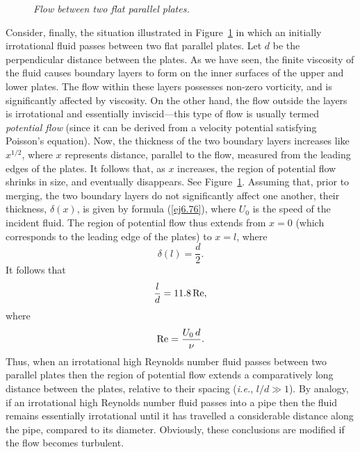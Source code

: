 \begin{figure}
\epsfysize=2.5in
\centerline{}
\caption{\em Flow between two flat parallel plates. }\label{fplate1}
\end{figure}

Consider, finally, the situation illustrated in Figure~\ref{fplate1} in which an initially irrotational fluid
passes between two flat parallel plates. Let $d$ be the perpendicular distance between the plates. 
As we have seen,  the finite viscosity of the fluid causes boundary layers to form on the inner surfaces of the upper and lower
plates. The flow within these layers possesses non-zero vorticity, and is significantly affected by viscosity. On the
other hand, the flow outside the layers is irrotational and essentially inviscid---this type of flow is usually
termed {\em potential flow}\/ (since it can be derived from a velocity potential satisfying Poisson's equation). 
Now, the thickness of the two boundary layers increases like $x^{1/2}$, where $x$ represents distance, parallel to the
flow,  measured from the
leading edges of the  plates. It follows that, as $x$ increases, the region of potential flow shrinks in size, and
eventually disappears. See Figure~\ref{fplate1}. Assuming that, prior to merging, the two boundary layers do not significantly affect one another, 
their thickness, $\delta(x)$,  is given by formula (\ref{ej6.76}), where $U_0$ is the speed of the incident fluid. 
The region of potential flow thus extends from $x=0$ (which corresponds to the leading edge of the plates) to $x=l$, where
\begin{equation}
\delta(l) = \frac{d}{2}.
\end{equation}
It follows that
\begin{equation}
\frac{l}{d} = 11.8\,{\rm Re},
\end{equation}
where
\begin{equation}
{\rm Re} = \frac{U_0\,d}{\nu}.
\end{equation}
Thus, when an irrotational high Reynolds number fluid passes between two parallel plates then the region of potential flow extends a comparatively long distance between the plates, relative to their spacing ({\em i.e.}, $l/d\gg 1$). By analogy, if an irrotational high Reynolds number fluid
passes into a pipe then the fluid remains essentially irrotational until it has travelled  a considerable distance along the
pipe, compared to its diameter. Obviously, these conclusions are modified if the flow becomes turbulent.

